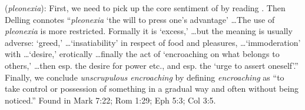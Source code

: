 \item[Unscrupulous encroaching,]

(\textit{pleonexia}):
First, we need to pick up the core sentiment of  by reading . Then  Delling connotes ``\emph{pleonexia} `the will to press one's advantage' \ldots The use of \emph{pleonexia} is more restricted. Formally it is `excess,' \ldots but the meaning is usually adverse: `greed,' \ldots `insatiability' in respect of food and pleasures, \ldots `immoderation' with \ldots `desire,' erotically \ldots finally the act of `encroaching on what belongs to others,' \ldots then esp. the desire for power etc., and esp. the `urge to assert oneself'.''
Finally, we conclude \emph{unscrupulous encroaching} by defining \emph{encroaching} as ``to take control or possession of something in a gradual way and often without being noticed.''
Found in Mark 7:22; Rom 1:29; Eph 5:3; Col 3:5.
